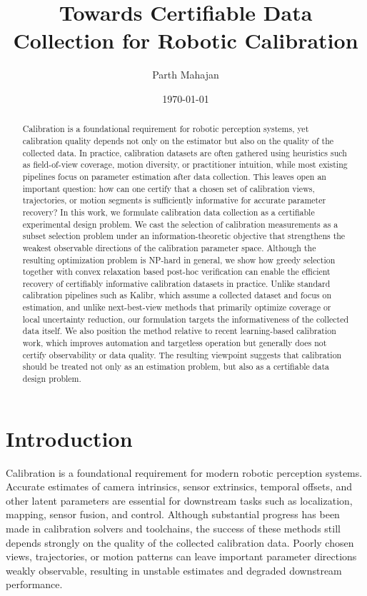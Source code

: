\documentclass[11pt]{article}
\title{Towards Certifiable Data Collection for Robotic Calibration}
\author{Parth Mahajan}
\date{\today}
\begin{document}
\maketitle

\begin{abstract}
Calibration is a foundational requirement for robotic perception systems,
yet calibration quality depends not only on the estimator but also on
the quality of the collected data.
In practice, calibration datasets are often gathered using heuristics such
as field-of-view coverage, motion diversity, or practitioner intuition,
while most existing pipelines focus on parameter estimation after data
collection.
This leaves open an important question: how can one certify that a chosen
set of calibration views, trajectories, or motion segments is sufficiently
informative for accurate parameter recovery?
In this work, we formulate calibration data collection as a certifiable
experimental design problem.
We cast the selection of calibration measurements as a subset selection
problem under an information-theoretic objective that strengthens the weakest
observable directions of the calibration parameter space.
Although the resulting optimization problem is NP-hard in general, we show
how greedy selection together with convex relaxation based post-hoc
verification can enable the efficient recovery of certifiably informative
calibration datasets in practice.
Unlike standard calibration pipelines such as Kalibr, which assume a
collected dataset and focus on estimation, and unlike next-best-view methods
that primarily optimize coverage or local uncertainty reduction, our
formulation targets the informativeness of the collected data itself.
We also position the method relative to recent learning-based calibration
work, which improves automation and targetless operation but generally does
not certify observability or data quality.
The resulting viewpoint suggests that calibration should be treated not only
as an estimation problem, but also as a certifiable data design problem.
\end{abstract}

\section{Introduction}
Calibration is a foundational requirement for modern robotic perception
systems.
Accurate estimates of camera intrinsics, sensor extrinsics, temporal
offsets, and other latent parameters are essential for downstream tasks such
as localization, mapping, sensor fusion, and control.
Although substantial progress has been made in calibration solvers and
toolchains, the success of these methods still depends strongly on the
quality of the collected calibration data.
Poorly chosen views, trajectories, or motion patterns can leave important
parameter directions weakly observable, resulting in unstable estimates and
degraded downstream performance.
\end{document}
